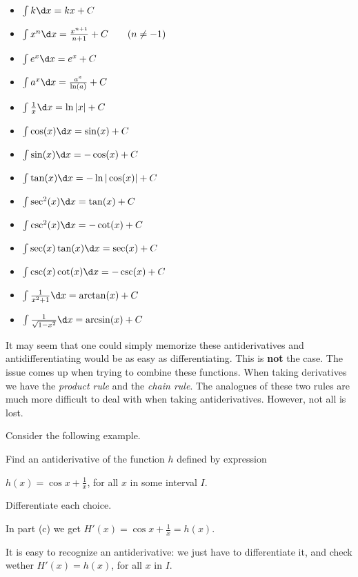 \documentclass{ximera}
\begin{document}
\begin{theorem}\label{theorem:basicAnti} \hfil
\begin{itemize}
\item $\int k \d x= kx+C$
\item $\int x^n \d x= \frac{x^{n+1}}{n+1}+C\qquad(n\ne-1)$
\item $\int e^x \d x= e^x + C$
\item $\int a^x \d x= \frac{a^x}{\ln(a)}+C$
\item $\int \frac{1}{x} \d x= \ln|x|+C$
\item $\int \cos(x) \d x = \sin(x) + C$
\item $\int \sin(x) \d x = -\cos(x) + C$  
\item $\int \tan(x) \d x = -\ln|\cos(x)| + C$  
\item $\int \sec^2(x) \d x = \tan(x) + C$ 
\item $\int \csc^2(x) \d x = -\cot(x) + C$
\item $\int \sec(x)\tan(x) \d x = \sec(x) + C$
\item $\int \csc(x)\cot(x) \d x = -\csc(x) + C$
\item $\int \frac{1}{x^2+1}\d x = \arctan(x) + C$
\item $\int \frac{1}{\sqrt{1-x^2}}\d x= \arcsin(x)+C$
\end{itemize}
\end{theorem}

It may seem that one could simply memorize these antiderivatives and
antidifferentiating would be as easy as differentiating. This is
\textbf{not} the case. The issue comes up when trying to combine these
functions.  When taking derivatives we have the \textit{product rule}
and the \textit{chain rule}. The analogues of these two rules are much
more difficult to deal with when taking antiderivatives. However, not
all is lost. 

Consider the following example.
\begin{example}
  Find  an antiderivative of the function $h$ defined by expression
  
   $h(x)=\cos{x}+\frac{1}{x}$, for all $x$ in some interval $I$.
  \begin{multipleChoice}
  \end{multipleChoice}
  \begin{feedback}
    Differentiate each choice.
    
     In part (c) we get $H'(x)=\cos{x}+\frac{1}{x}=h(x)$.
  \end{feedback}
\end{example}
It is easy to recognize an antiderivative: we just have to differentiate it, and check wether $H'(x)=h(x)$, for all $x$ in $I$.
\end{document}
